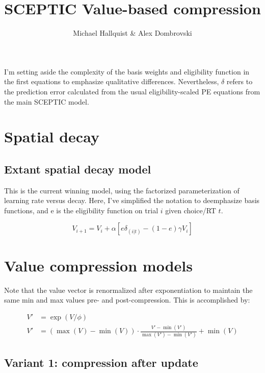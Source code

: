 \documentclass[12pt]{article}
\title{SCEPTIC Value-based compression}
\author{Michael Hallquist \& Alex Dombrovski}
\begin{document}
\maketitle

I'm setting aside the complexity of the basis weights and eligibility function in the first equations to emphasize qualitative differences. Nevertheless,
$\delta$ refers to the prediction error calculated from the usual eligibility-scaled PE equations from the main SCEPTIC model.

\section{Spatial decay}
\subsection{Extant spatial decay model}

This is the current winning model, using the factorized parameterization of learning rate versus decay. Here, I've simplified the notation to deemphasize basis functions, and e
is the eligibility function on trial $i$ given choice/RT $t$.

\begin{equation}
V_{i+1} = V_{i} + \alpha [ e \delta_{(i | t)}  - (1-e) \gamma V_{i} ]
\end{equation}

\section{Value compression models}

Note that the value vector is renormalized after exponentiation to maintain the same min and max values pre- and post-compression. This is accomplished by:

\begin{align}
V' &= \exp{(V/\phi)} \\
V' &= (\max(V) - \min(V)) \cdot \frac{V' - \min(V')}{\max(V') - \min(V')} + \min(V)
\end{align}

\subsection{Variant 1: compression after update}
\end{document}

